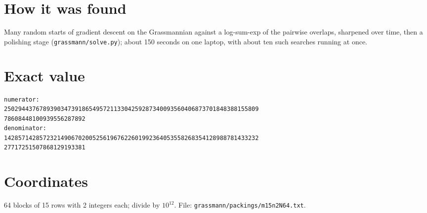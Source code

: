 \documentclass[11pt,a4paper]{article}
\begin{document}
\section{How it was found}
Many random starts of gradient descent on the Grassmannian against a log-sum-exp of the pairwise overlaps, sharpened over time, then a polishing stage (\texttt{grassmann/solve.py}); about 150 seconds on one laptop, with about ten such searches running at once.


\appendix
\section{Exact value}
{\small
\begin{verbatim}
numerator:
250294437678939034739186549572113304259287340093560406873701848388155809
78608448100939556287892
denominator:
142857142857232149067020052561967622601992364053558268354128988781433232
27717251507868129193381
\end{verbatim}}

\section{Coordinates}
64 blocks of 15 rows with 2 integers each; divide by $10^{12}$. File: \texttt{grassmann/packings/m15n2N64.txt}.
{\tiny
\begin{multicols}{4}
\end{multicols}}
\end{document}
